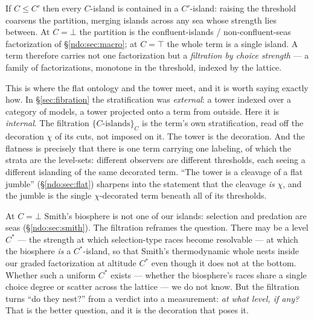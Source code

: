 \begin{proposition}\label{ndo:prop:filtration}
If $C \le C'$ then every $C$-island is contained in a $C'$-island: raising the threshold coarsens
the partition, merging islands across any sea whose strength lies between. At $C = \bot$ the
partition is the confluent-islands / non-confluent-seas factorization of \S\ref{ndo:sec:macro}; at
$C = \top$ the whole term is a single island. A term therefore carries not one factorization but a
\emph{filtration by choice strength} --- a family of factorizations, monotone in the threshold,
indexed by the lattice.
\end{proposition}

This is where the flat ontology and the tower meet, and it is worth saying exactly how. In
\S\ref{sec:fibration} the stratification was \emph{external}: a tower indexed over a category of models,
a tower projected onto a term from outside. Here it is \emph{internal}. The filtration
$\{C\text{-islands}\}_{C}$ is the term's own stratification, read off the decoration $\chi$ of its
cuts, not imposed on it. The tower is the decoration. And the flatness is precisely that there is
one term carrying one labeling, of which the strata are the level-sets: different observers are
different thresholds, each seeing a different islanding of the same decorated term. ``The tower is a
cleavage of a flat jumble'' (\S\ref{ndo:sec:flat}) sharpens into the statement that the cleavage
\emph{is} $\chi$, and the jumble is the single $\chi$-decorated term beneath all of its thresholds.

\begin{remark}\label{ndo:rmk:nest}
At $C = \bot$ Smith's biosphere is not one of our islands: selection and predation are seas
(\S\ref{ndo:sec:smith}). The filtration reframes the question. There may be a level $C^{*}$ --- the
strength at which selection-type races become resolvable --- at which the biosphere \emph{is} a
$C^{*}$-island, so that Smith's thermodynamic whole nests inside our graded factorization at
altitude $C^{*}$ even though it does not at the bottom. Whether such a uniform $C^{*}$ exists ---
whether the biosphere's races share a single choice degree or scatter across the lattice --- we do
not know. But the filtration turns ``do they nest?'' from a verdict into a measurement: \emph{at
what level, if any?} That is the better question, and it is the decoration that poses it.
\end{remark}

